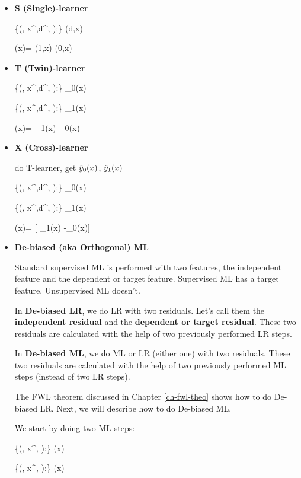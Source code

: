 \begin{itemize}
\item {\bf S (Single)-learner}

\beq
\{(\s, x^\s,d^\s,  ):\s\in \Sigma\}
\mlarr \haty(d,x)
\eeq

\beq
\delta(x)= \haty(1,x)-\haty(0,x)
\eeq

\item {\bf T (Twin)-learner}

\beq
\{(\s, x^\s,d^,  ):\s\in \Sigma\}
\mlarr \haty_0(x)
\eeq

\beq
\{(\s, x^\s,d^,  ):\s\in \Sigma\}
\mlarr \haty_1(x)
\eeq

\beq
\delta(x)= \haty_1(x)-\haty_0(x)
\eeq

\item {\bf X (Cross)-learner}

do T-learner, get ${\hat{y}}_0(x)$, ${\hat{y}}_1(x)$


\beq
\{(\s, x^\s,d^, ):\s\in \Sigma\}
\mlarr \caly_0(x)
\eeq

\beq
\{(\s, x^\s,d^, ):\s\in \Sigma\}
\mlarr \caly_1(x)
\eeq

\beq
\delta(x)= [
\caly_1(x) -\caly_0(x)]
\eeq

\item {\bf De-biased (aka Orthogonal) ML}

Standard supervised ML is performed with two features,
the independent feature and the dependent or target feature.
Supervised ML has a target feature. Unsupervised ML doesn't.


In {\bf De-biased LR}, we
do LR
with two residuals. Let's call them
the {\bf independent residual} and the
{\bf dependent or target residual}.
These  two residuals are calculated
with the help of two previously
performed LR steps.


In {\bf De-biased ML},
we do ML or LR (either one) with two residuals.
These  two residuals are calculated
with the help of two previously
performed ML steps (instead of two LR steps).

The FWL theorem
discussed in Chapter \ref{ch-fwl-theo}
shows how to do De-biased LR. Next,
we will describe how to 
do De-biased ML.

We start by doing two ML steps:

\beq
\{(\s, x^\s, ):\s\in \Sigma\}
\mlarr {}(x)
\eeq

\beq
\{(\s, x^\s, ):\s\in \Sigma\}
\mlarr \haty(x)
\eeq


\end{itemize}
